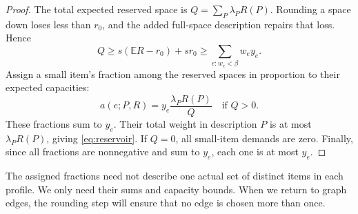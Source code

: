 \documentclass[11pt]{article}
\theoremstyle{definition}\newtheorem{algorithm}{Algorithm}[section]
\numberwithin{equation}{section}
\theoremstyle{remark}\newtheorem*{remark}{Remark}
\newcommand{\E}{\mathbb E}
\begin{document}
\begin{proof}
The total expected reserved space is
$Q=\sum_P\lambda_PR(P)$. Rounding a space down loses less than $r_0$,
and the added full-space description repairs that loss. Hence
\[
 Q\ge s(\E R-r_0)+sr_0
 \ge\sum_{e:w_e<\beta}w_e y_e.
\]
Assign a small item's fraction among the reserved spaces in proportion
to their expected capacities:
\[
 a(e;P,R)=y_e\frac{\lambda_PR(P)}{Q}\quad\text{if }Q>0.
\]
These fractions sum to $y_e$. Their total weight in description $P$
is at most $\lambda_PR(P)$, giving \eqref{eq:reservoir}. If $Q=0$,
all small-item demands are zero. Finally, since all fractions are
nonnegative and sum to $y_e$, each one is at most $y_e$.
\end{proof}

The assigned fractions need not describe one actual set of distinct
items in each profile. We only need their sums and capacity
bounds. When we return to graph edges, the rounding step will ensure
that no edge is chosen more than once.
\end{document}

